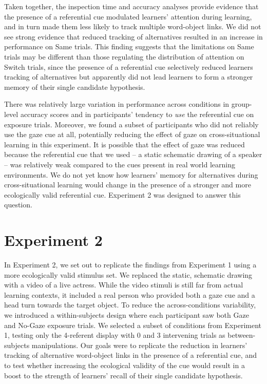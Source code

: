 \documentclass[authoryear, review]{elsarticle}
\begin{document}
Taken together, the inspection time and accuracy analyses provide
evidence that the presence of a referential cue modulated learners'
attention during learning, and in turn made them less likely to track
multiple word-object links. We did not see strong evidence that reduced
tracking of alternatives resulted in an increase in performance on Same
trials. This finding suggests that the limitations on Same trials may be
different than those regulating the distribution of attention on Switch
trials, since the presence of a referential cue selectively reduced
learners tracking of alternatives but apparently did not lead learners
to form a stronger memory of their single candidate hypothesis.

There was relatively large variation in performance across conditions in
group-level accuracy scores and in participants' tendency to \emph{use}
the referential cue on exposure trials. Moreover, we found a subset of
participants who did not reliably use the gaze cue at all, potentially
reducing the effect of gaze on cross-situational learning in this
experiment. It is possible that the effect of gaze was reduced because
the referential cue that we used -- a static schematic drawing of a
speaker -- was relatively weak compared to the cues present in real
world learning environments. We do not yet know how learners' memory for
alternatives during cross-situational learning would change in the
presence of a stronger and more ecologically valid referential cue.
Experiment 2 was designed to answer this question.

\section{Experiment 2}\label{experiment-2}

In Experiment 2, we set out to replicate the findings from Experiment 1
using a more ecologically valid stimulus set. We replaced the static,
schematic drawing with a video of a live actress. While the video
stimuli is still far from actual learning contexts, it included a real
person who provided both a gaze cue and a head turn towards the target
object. To reduce the across-conditions variability, we introduced a
within-subjects design where each participant saw both Gaze and No-Gaze
exposure trials. We selected a subset of conditions from Experiment 1,
testing only the 4-referent display with 0 and 3 intervening trials as
between-subjects manipulations. Our goals were to replicate the
reduction in learners' tracking of alternative word-object links in the
presence of a referential cue, and to test whether increasing the
ecological validity of the cue would result in a boost to the strength
of learners' recall of their single candidate hypothesis.
\end{document}
